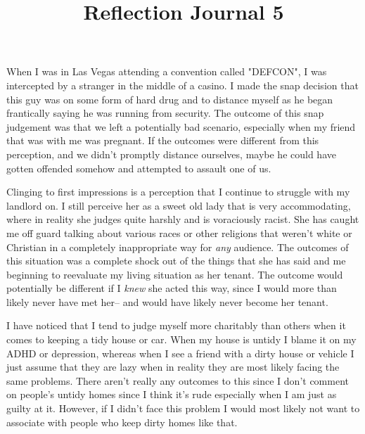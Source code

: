 \documentclass[12pt]{article}
\begin{document}
\title{Reflection Journal 5}


\par
When I was in Las Vegas attending a convention called "DEFCON", I was intercepted by a stranger in the middle of a casino. I made the snap decision that this guy was on some form of hard drug and to distance myself as he began frantically saying he was running from security. The outcome of this snap judgement was that we left a potentially bad scenario, especially when my friend that was with me was pregnant. If the outcomes were different from this perception, and we didn't promptly distance ourselves, maybe he could have gotten offended somehow and attempted to assault one of us.
\par
Clinging to first impressions is a perception that I continue to struggle with my landlord on. I still perceive her as a sweet old lady that is very accommodating, where in reality she judges quite harshly and is voraciously racist. She has caught me off guard talking about various races or other religions that weren't white or Christian in a completely inappropriate way for \emph{any} audience. The outcomes of this situation was a complete shock out of the things that she has said and me beginning to reevaluate my living situation as her tenant. The outcome would potentially be different if I \emph{knew} she acted this way, since I would more than likely never have met her-- and would have likely never become her tenant. 
\par
I have noticed that I tend to judge myself more charitably than others when it comes to keeping a tidy house or car. When my house is untidy I blame it on my ADHD or depression, whereas when I see a friend with a dirty house or vehicle I just assume that they are lazy when in reality they are most likely facing the same problems. There aren't really any outcomes to this since I don't comment on people's untidy homes since I think it's rude especially when I am just as guilty at it. However, if I didn't face this problem I would most likely not want to associate with people who keep dirty homes like that.
\end{document}
